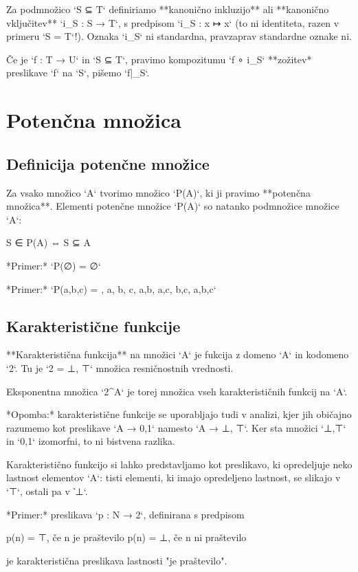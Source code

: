 Za podmnožico `S ⊆ T` definiriamo **kanonično inkluzijo** ali **kanonično vključitev**
`i_S : S → T`, s predpisom `i_S : x ↦ x` (to ni identiteta, razen v primeru `S = T`!).
Oznaka `i_S` ni standardna, pravzaprav standardne oznake ni.

Če je `f : T → U` in `S ⊆ T`, pravimo kompozitumu `f ∘ i_S` **zožitev* preslikave `f` na
`S`, pišemo `f|_S`.

\section{Potenčna množica}

\subsection{Definicija potenčne množice}

Za vsako množico `A` tvorimo množico `P(A)`, ki ji pravimo **potenčna množica**.
Elementi potenčne množice `P(A)` so natanko podmnožice množice `A`:

    S ∈ P(A) ⇔ S ⊆ A

*Primer:* `P(∅) = {∅}`

*Primer:* `P({a,b,c}) = {{}, {a}, {b}, {c}, {a,b}, {a,c}, {b,c}, {a,b,c}}`

\subsection{Karakteristične funkcije}

**Karakteristična funkcija** na množici `A` je fukcija z domeno `A` in kodomeno `2`.
Tu je `2 = {⊥, ⊤}` množica resničnostnih vrednosti.

Eksponentna množica `2^A` je torej množica vseh karakterističnih funkcij na `A`.

*Opomba:* karakteristične funkcije se uporabljajo tudi v analizi, kjer jih
običajno razumemo kot preslikave `A → {0,1}` namesto `A → {⊥, ⊤}`. Ker sta
množici `{⊥,⊤}` in `{0,1}` izomorfni, to ni bistvena razlika.

Karakteristično funkcijo si lahko predstavljamo kot preslikavo, ki opredeljuje
neko lastnost elementov `A`: tisti elementi, ki imajo opredeljeno lastnost, se
slikajo v `⊤`, ostali pa v ‵⊥`.

*Primer:* preslikava `p : N → 2`, definirana s predpisom

    p(n) = ⊤, če n je praštevilo
    p(n) = ⊥, če n ni praštevilo

je karakteristična preslikava lastnosti "je praštevilo".

